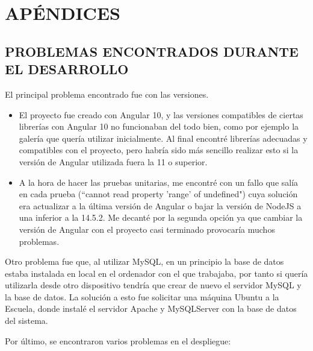 \newpage
\chapter{APÉNDICES}
\newpage

\section{PROBLEMAS ENCONTRADOS DURANTE EL DESARROLLO}
El principal problema encontrado fue con las versiones. 
\begin{itemize}
\item El proyecto fue creado con Angular 10, y las versiones compatibles de ciertas librerías con Angular 10 no funcionaban del todo bien, como por ejemplo la galería que quería utilizar inicialmente. Al final encontré librerías adecuadas y compatibles con el proyecto, pero habría sido más sencillo realizar esto si la versión de Angular utilizada fuera la 11 o superior.
\item A la hora de hacer las pruebas unitarias, me encontré con un fallo que salía en cada prueba (``cannot read property 'range' of undefined") cuya solución era actualizar a la última versión de Angular o bajar la versión de NodeJS a una inferior a la 14.5.2. Me decanté por la segunda opción ya que cambiar la versión de Angular con el proyecto casi terminado provocaría muchos problemas.
\end{itemize}
\par Otro problema fue que, al utilizar MySQL, en un principio la base de datos estaba instalada en local en el ordenador con el que trabajaba, por tanto si quería utilizarla desde otro dispositivo tendría que crear de nuevo el servidor MySQL y la base de datos. La solución a esto fue solicitar una máquina Ubuntu a la Escuela, donde instalé el servidor Apache y MySQLServer con la base de datos del sistema.\\
\par Por último, se encontraron varios problemas en el despliegue:
